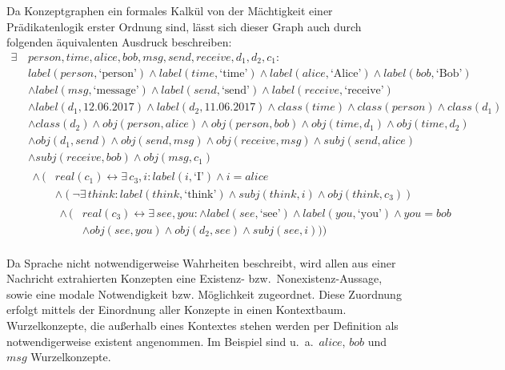 \documentclass[11pt, a4paper]{scrreprt}
\begin{document}
Da Konzeptgraphen ein formales Kalkül von der Mächtigkeit einer Prädikatenlogik erster Ordnung sind, lässt sich dieser Graph auch durch folgenden äquivalenten Ausdruck beschreiben:
\begin{align*}
	\exists \,& person, time, alice, bob, msg, send, receive, d_1, d_2, c_1:\\
	& label(person, \text{`person'}) \land label(time, \text{`time'}) \land label(alice, \text{`Alice'}) \land label(bob, \text{`Bob'})\\
	& \land label(msg, \text{`message'}) \land label(send, \text{`send'}) \land label(receive, \text{`receive'})\\
	& \land label(d_1, 12.06.2017) \land label(d_2, 11.06.2017) \land class(time) \land class(person) \land class(d_1)\\
	& \land class(d_2) \land obj(person, alice) \land obj(person, bob) \land obj(time, d_1) \land obj(time, d_2)\\
	& \land obj(d_1, send) \land obj(send, msg) \land obj(receive, msg) \land subj(send, alice)\\
	& \land subj(receive, bob) \land obj(msg, c_1)\\
	& \begin{aligned}
		\land \,(&real(c_1) \leftrightarrow \exists \,c_3, i: label(i, \text{`I'}) \land i = alice\\
		& \land (\lnot\exists \,think: label(think, \text{`think'}) \land subj(think, i) \land obj(think, c_3))\\
		& \begin{aligned}
			\land \,(&real(c_3) \leftrightarrow \exists \,see, you: \land label(see, \text{`see'}) \land label(you, \text{`you'}) \land you = bob\\
			& \land obj(see, you) \land obj(d_2, see) \land subj(see, i)))
		\end{aligned}
	\end{aligned}
\end{align*}

Da Sprache nicht notwendigerweise Wahrheiten beschreibt, wird allen aus einer Nachricht extrahierten Konzepten eine Existenz- bzw.\ Nonexistenz-Aussage, sowie eine modale Notwendigkeit bzw. Möglichkeit zugeordnet.
Diese Zuordnung erfolgt mittels der Einordnung aller Konzepte in einen Kontextbaum.
Wurzelkonzepte, die außerhalb eines Kontextes stehen werden per Definition als notwendigerweise existent angenommen.
Im Beispiel sind u.~a.\  \(alice\), \(bob\) und \(msg\) Wurzelkonzepte.\\
\end{document}
